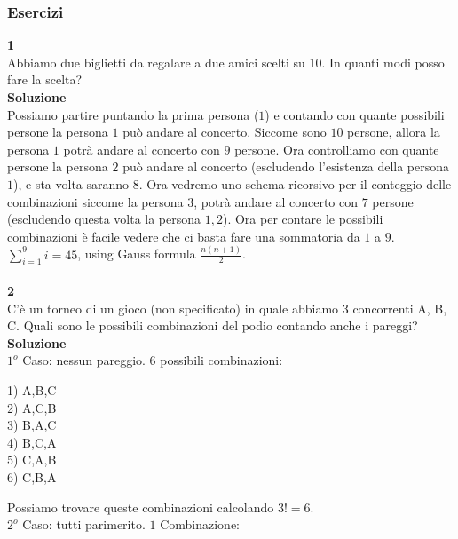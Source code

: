 \documentclass[11pt]{article}
\begin{document}
        \subsubsection{Esercizi}
            \textbf{\large 1}\\
            Abbiamo due biglietti da regalare a due amici scelti su 10. In quanti modi posso fare la scelta?
            \\
            \textbf{\large Soluzione}\\
            Possiamo partire puntando la prima persona ($1$) e contando con quante possibili persone la persona $1$ pu\`o andare al concerto. Siccome sono $10$ persone, allora la persona $1$ potr\`a andare al concerto con $9$ persone.
            Ora controlliamo con quante persone la persona $2$ pu\`o andare al concerto (escludendo l'esistenza della persona $1$), e sta volta saranno $8$.
            Ora vedremo uno schema ricorsivo per il conteggio delle combinazioni siccome la persona $3$, potr\`a andare al concerto con $7$ persone (escludendo questa volta la persona $1, 2$).
            Ora per contare le possibili combinazioni \`e facile vedere che ci basta fare una sommatoria da $1$ a $9$.
            \\    
            $\sum_{i=1}^{9}i = 45$, using Gauss formula $\frac{n(n+1)}{2}$.
            \\
            \\
            \textbf{\large 2}\\
            C'è un torneo di un gioco (non specificato) in quale abbiamo 3 concorrenti A, B, C. Quali sono le possibili combinazioni del podio contando anche i pareggi?
            \\
            \textbf{\large Soluzione}\\
            $1^o$ Caso: nessun pareggio. 6 possibili combinazioni:
            \begin{center}
            	1) A,B,C\\
            	2) A,C,B\\
            	3) B,A,C\\
            	4) B,C,A\\
            	5) C,A,B\\
            	6) C,B,A\\
            \end{center}
            Possiamo trovare queste combinazioni calcolando $3! = 6$.\\
            $2^o$ Caso: tutti parimerito. $1$ Combinazione:\\
\end{document}
